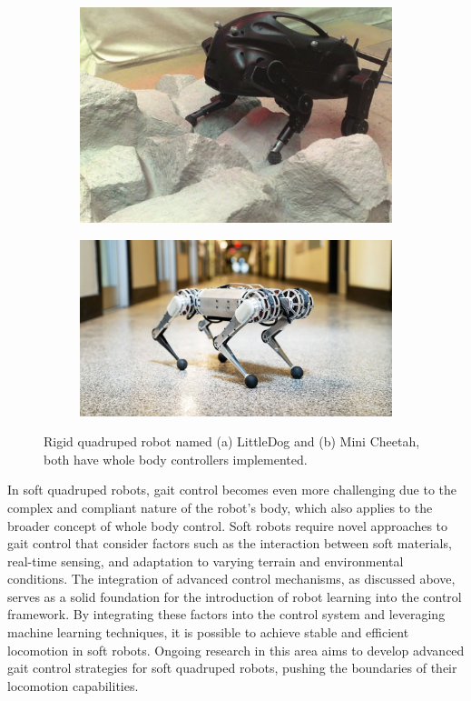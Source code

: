 \begin{figure}[htb]
\centering
    \begin{subfigure}[b]{0.45\textwidth}
    \centering 
        \includegraphics[height=0.6\linewidth]{img/chap2/LittleDog.jpg}
        \caption{}
    \end{subfigure}
    \begin{subfigure}[b]{0.45\textwidth}
    \centering
        \includegraphics[height=0.6\linewidth]{img/chap2/minicheetah.jpg}
        \caption{}
    \end{subfigure}
    \caption{Rigid quadruped robot named (a) LittleDog\cite{kalakrishnan2010Fast} and (b) Mini Cheetah\cite{bledt2018MIT}, both have whole body controllers implemented.}
    \label{fig:LittleDog}
\end{figure}


In soft quadruped robots, gait control becomes even more challenging due to the complex and compliant nature of the robot's body, which also applies to the broader concept of whole body control. Soft robots require novel approaches to gait control that consider factors such as the interaction between soft materials, real-time sensing, and adaptation to varying terrain and environmental conditions. The integration of advanced control mechanisms, as discussed above, serves as a solid foundation for the introduction of robot learning into the control framework. By integrating these factors into the control system and leveraging machine learning techniques, it is possible to achieve stable and efficient locomotion in soft robots. Ongoing research in this area aims to develop advanced gait control strategies for soft quadruped robots, pushing the boundaries of their locomotion capabilities\cite{gong2010Review}.

